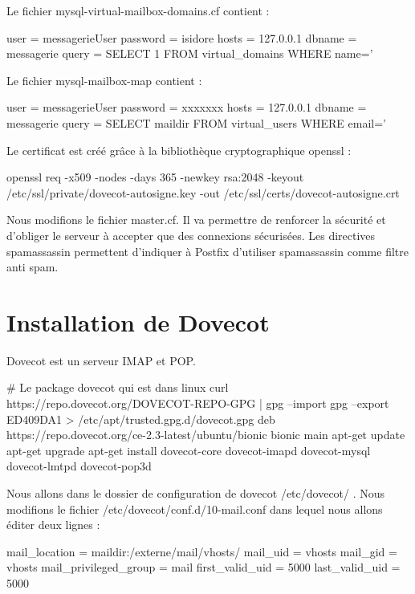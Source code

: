 \documentclass[a4paper,12pt,french]{report} %
\begin{document}
Le fichier mysql-virtual-mailbox-domains.cf contient :
\begin{exempleConsole}
user = messagerieUser
password = isidore
hosts = 127.0.0.1
dbname = messagerie
query = SELECT 1 FROM virtual_domains WHERE name='%
\end{exempleConsole}

Le fichier mysql-mailbox-map contient :
\begin{exempleConsole}
user = messagerieUser
password = xxxxxxx
hosts = 127.0.0.1
dbname = messagerie
query = SELECT maildir FROM virtual_users WHERE email='%
\end{exempleConsole}

Le certificat est créé grâce à la bibliothèque cryptographique openssl :
\begin{exempleConsole}
openssl req -x509 -nodes -days 365 -newkey rsa:2048 -keyout /etc/ssl/private/dovecot-autosigne.key -out /etc/ssl/certs/dovecot-autosigne.crt
\end{exempleConsole}

Nous modifions le fichier master.cf. Il va permettre de renforcer la sécurité et d'obliger le serveur à accepter que des connexions sécurisées.
\cesure
{}
Les directives spamassassin permettent d'indiquer à Postfix d'utiliser spamassassin comme filtre anti spam.

\section{Installation de Dovecot}
Dovecot est un serveur IMAP et POP.
\begin{exempleConsole}
# Le package dovecot qui est dans linux 
curl https://repo.dovecot.org/DOVECOT-REPO-GPG | gpg --import
gpg --export ED409DA1 > /etc/apt/trusted.gpg.d/dovecot.gpg
deb https://repo.dovecot.org/ce-2.3-latest/ubuntu/bionic bionic main
apt-get update 
apt-get upgrade
apt-get install dovecot-core dovecot-imapd dovecot-mysql dovecot-lmtpd dovecot-pop3d
\end{exempleConsole}

Nous allons dans le dossier de configuration de dovecot /etc/dovecot/ .
Nous modifions le fichier /etc/dovecot/conf.d/10-mail.conf dans lequel nous allons éditer deux lignes :
\begin{exempleConsole}
mail_location = maildir:/externe/mail/vhosts/%
mail_uid = vhosts
mail_gid = vhosts
mail_privileged_group = mail
first_valid_uid = 5000
last_valid_uid = 5000
\end{exempleConsole}
\end{document}
